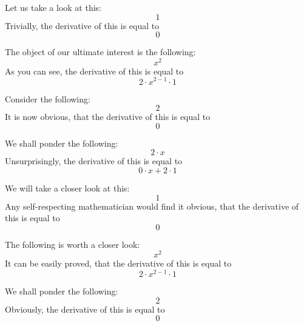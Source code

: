 \documentclass{article}
\begin{document}
Let us take a look at this:
\begin{equation}
1 
\end{equation}
Trivially, the derivative of this is equal to
\begin{equation}
0 
\end{equation}

The object of our ultimate interest is the following:
\begin{equation}
x ^{2 } 
\end{equation}
As you can see, the derivative of this is equal to
\begin{equation}
2 \cdot x ^{2 - 1 } \cdot 1 
\end{equation}

Consider the following:
\begin{equation}
2 
\end{equation}
It is now obvious, that the derivative of this is equal to
\begin{equation}
0 
\end{equation}

We shall ponder the following:
\begin{equation}
2 \cdot x 
\end{equation}
Unsurprisingly, the derivative of this is equal to
\begin{equation}
0 \cdot x + 2 \cdot 1 
\end{equation}

We will take a closer look at this:
\begin{equation}
1 
\end{equation}
Any self-respecting mathematician would find it obvious, that the derivative of this is equal to
\begin{equation}
0 
\end{equation}

The following is worth a closer look:
\begin{equation}
x ^{2 } 
\end{equation}
It can be easily proved, that the derivative of this is equal to
\begin{equation}
2 \cdot x ^{2 - 1 } \cdot 1 
\end{equation}

We shall ponder the following:
\begin{equation}
2 
\end{equation}
Obviously, the derivative of this is equal to
\begin{equation}
0 
\end{equation}
\end{document}

